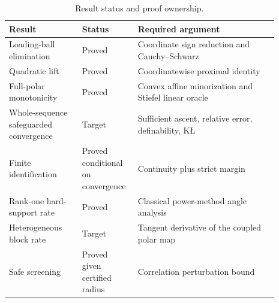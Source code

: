 \begin{table}[t]
\centering
\caption{Result status and proof ownership.}
\label{tab:a-theorems}
\small
\begin{tabular}{p{0.25\linewidth}p{0.16\linewidth}p{0.48\linewidth}}
\toprule
Result & Status & Required argument \\
\midrule
Loading-ball elimination & Proved & Coordinate sign reduction and Cauchy--Schwarz \\
Quadratic lift & Proved & Coordinatewise proximal identity \\
Full-polar monotonicity & Proved & Convex affine minorization and Stiefel linear oracle \\
Whole-sequence safeguarded convergence & Target & Sufficient ascent, relative error, definability, KŁ \\
Finite identification & Proved conditional on convergence & Continuity plus strict margin \\
Rank-one hard-support rate & Proved & Classical power-method angle analysis \\
Heterogeneous block rate & Target & Tangent derivative of the coupled polar map \\
Safe screening & Proved given certified radius & Correlation perturbation bound \\
\bottomrule
\end{tabular}
\end{table}
